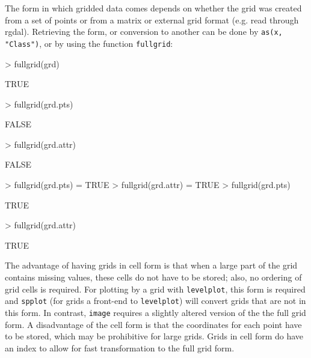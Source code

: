 \documentclass{article}
\begin{document}
The form in which gridded data comes depends on whether the grid was
created from a set of points or from a matrix or external grid format
(e.g. read through rgdal). Retrieving the form, or conversion to another
can be done by {\tt as(x, "Class")}, or by using the function {\tt fullgrid}:
\begin{Schunk}
\begin{Sinput}
> fullgrid(grd)
\end{Sinput}
\begin{Soutput}
[1] TRUE
\end{Soutput}
\begin{Sinput}
> fullgrid(grd.pts)
\end{Sinput}
\begin{Soutput}
[1] FALSE
\end{Soutput}
\begin{Sinput}
> fullgrid(grd.attr)
\end{Sinput}
\begin{Soutput}
[1] FALSE
\end{Soutput}
\begin{Sinput}
> fullgrid(grd.pts) = TRUE
> fullgrid(grd.attr) = TRUE
> fullgrid(grd.pts)
\end{Sinput}
\begin{Soutput}
[1] TRUE
\end{Soutput}
\begin{Sinput}
> fullgrid(grd.attr)
\end{Sinput}
\begin{Soutput}
[1] TRUE
\end{Soutput}
\end{Schunk}

The advantage of having grids in cell form is that when a large part
of the grid contains missing values, these cells do not have to be
stored; also, no ordering of grid cells is required. For plotting by
a grid with {\tt levelplot}, this form is required and {\tt spplot}
(for grids a front-end to {\tt levelplot}) will convert grids that are
not in this form.  In contrast, {\tt image} requires a slightly altered
version of the the full grid form.  A disadvantage of the cell form is
that the coordinates for each point have to be stored, which may be
prohibitive for large grids.  Grids in cell form do have an index to
allow for fast transformation to the full grid form.
\end{document}
